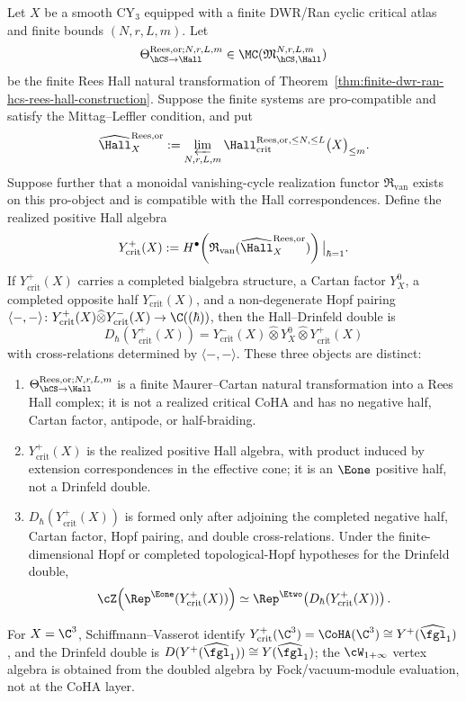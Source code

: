 \begin{theorem}
\label{thm:finite-rees-realized-coha-drinfeld-double}
Let $X$ be a smooth CY$_3$ equipped with a finite DWR/Ran cyclic
critical atlas and finite bounds $(N,r,L,m)$. Let
\[
 \Theta_{\hCS\to\Hall}^{\mathrm{Rees},\mathrm{or};N,r,L,m}
 \in
 \MC(\mathfrak M_{\hCS,\Hall}^{N,r,L,m})
\]
be the finite Rees Hall natural transformation of
Theorem~\ref{thm:finite-dwr-ran-hcs-rees-hall-construction}. Suppose
the finite systems are pro-compatible and satisfy the
Mittag--Leffler condition, and put
\[
 \widehat{\Hall}^{\mathrm{Rees},\mathrm{or}}_X
 :=
 \varprojlim_{N,r,L,m}
 \Hall_{\mathrm{crit}}^{\mathrm{Rees},\mathrm{or},\leq N,\leq L}
 \bigl(X\bigr)_{\leq m}.
\]
Suppose further that a monoidal vanishing-cycle realization functor
$\mathfrak R_{\mathrm{van}}$ exists on this pro-object and is
compatible with the Hall correspondences. Define the realized positive
Hall algebra
\[
 Y^+_{\mathrm{crit}}(X)
 :=
 H^\bullet\!\left(
 \mathfrak R_{\mathrm{van}}
 (\widehat{\Hall}^{\mathrm{Rees},\mathrm{or}}_X)
 \right)\big|_{\hbar=1}.
\]
If $Y^+_{\mathrm{crit}}(X)$ carries a completed bialgebra structure,
a Cartan factor $Y^0_X$, a completed opposite half $Y^-_{\mathrm{crit}}(X)$,
and a non-degenerate Hopf pairing
$\langle-,-\rangle\colon
Y^+_{\mathrm{crit}}(X)\widehat\otimes
Y^-_{\mathrm{crit}}(X)\to\C((\hbar))$, then the Hall--Drinfeld double is
\[
 D_\hbar(Y^+_{\mathrm{crit}}(X))
 =
 Y^-_{\mathrm{crit}}(X)
 \widehat\otimes
 Y^0_X
 \widehat\otimes
 Y^+_{\mathrm{crit}}(X)
\]
with cross-relations determined by $\langle-,-\rangle$. These three
objects are distinct:
\begin{enumerate}[label=\textup{(\roman*)}]
 \item $\Theta_{\hCS\to\Hall}^{\mathrm{Rees},\mathrm{or};N,r,L,m}$
 is a finite Maurer--Cartan natural transformation into a Rees Hall
 complex; it is not a realized critical CoHA and has no negative half,
 Cartan factor, antipode, or half-braiding.
 \item $Y^+_{\mathrm{crit}}(X)$ is the realized positive Hall algebra,
 with product induced by extension correspondences in the effective
 cone; it is an $\Eone$ positive half, not a Drinfeld double.
 \item $D_\hbar(Y^+_{\mathrm{crit}}(X))$ is formed only after adjoining
 the completed negative half, Cartan factor, Hopf pairing, and
 double cross-relations. Under the finite-dimensional Hopf or completed
 topological-Hopf hypotheses for the Drinfeld double,
 \[
  \cZ\!\left(\Rep^{\Eone}(Y^+_{\mathrm{crit}}(X))\right)
  \simeq
  \Rep^{\Etwo}\!\left(D_\hbar(Y^+_{\mathrm{crit}}(X))\right).
 \]
\end{enumerate}
For $X=\C^3$, Schiffmann--Vasserot identify
$Y^+_{\mathrm{crit}}(\C^3)=\CoHA(\C^3)\cong
Y^+(\widehat{\fgl}_1)$, and the Drinfeld double is
$D(Y^+(\widehat{\fgl}_1))\cong Y(\widehat{\fgl}_1)$; the
$\cW_{1+\infty}$ vertex algebra is obtained from the doubled algebra
by Fock/vacuum-module evaluation, not at the CoHA layer.
\end{theorem}

